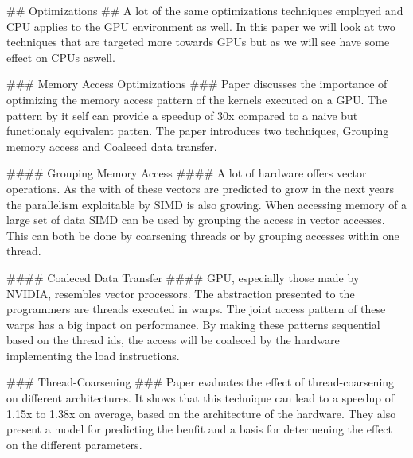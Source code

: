 \begin{markdown}

## Optimizations ##
A lot of the same optimizations techniques employed and CPU applies to
the GPU environment as well. In this paper we will look at two
techniques that are targeted more towards GPUs but as we will see have
some effect on CPUs aswell. 

### Memory Access Optimizations ###
Paper \cite{mem-acc} discusses the importance of optimizing the memory access
pattern of the kernels executed on a GPU. The pattern by it self can
provide a speedup of 30x compared to a naive but functionaly
equivalent patten. The paper introduces two techniques, Grouping
memory access and Coaleced data transfer. 

#### Grouping Memory Access ####
A lot of hardware offers vector operations. As the with of these
vectors are predicted to grow in the next years the parallelism
exploitable by SIMD is also growing. When accessing memory of a large
set of data SIMD can be used by grouping the access in vector
accesses. This can both be done by coarsening threads or by grouping
accesses within one thread. 

#### Coaleced Data Transfer ####
GPU, especially those made by NVIDIA, resembles vector processors. The
abstraction presented to the programmers are threads executed in
warps. The joint access pattern of these warps has a big inpact on
performance. By making these patterns sequential based on the thread
ids, the access will be coaleced by the hardware implementing the load
instructions. 

### Thread-Coarsening ###
Paper \cite{thd-coa} evaluates the effect of thread-coarsening on different
architectures. It shows that this technique can lead to a speedup of
1.15x to 1.38x on average, based on the architecture of the
hardware. They also present a model for predicting the benfit and
a basis for determening the effect on the different parameters.

\end{markdown}
